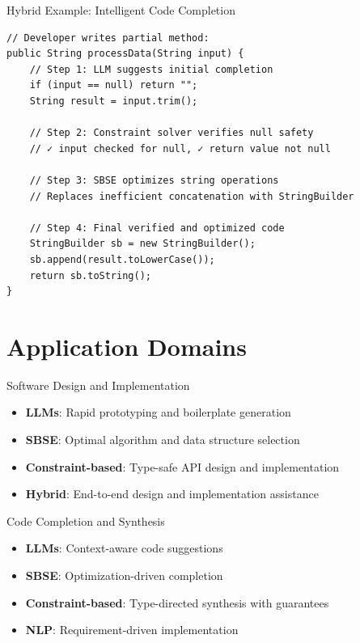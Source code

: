 \documentclass{beamer}
\begin{document}
\begin{frame}[fragile,t]{Hybrid Example: Intelligent Code Completion}
\begin{verbatim}
// Developer writes partial method:
public String processData(String input) {
    // Step 1: LLM suggests initial completion
    if (input == null) return "";
    String result = input.trim();
    
    // Step 2: Constraint solver verifies null safety
    // ✓ input checked for null, ✓ return value not null
    
    // Step 3: SBSE optimizes string operations
    // Replaces inefficient concatenation with StringBuilder
    
    // Step 4: Final verified and optimized code
    StringBuilder sb = new StringBuilder();
    sb.append(result.toLowerCase());
    return sb.toString();
}
\end{verbatim}
\end{frame}

\section{Application Domains}
\begin{frame}[t]{Software Design and Implementation}
\begin{itemize}
\item \textbf{LLMs}: Rapid prototyping and boilerplate generation
\item \textbf{SBSE}: Optimal algorithm and data structure selection
\item \textbf{Constraint-based}: Type-safe API design and implementation
\item \textbf{Hybrid}: End-to-end design and implementation assistance
\end{itemize}
\end{frame}

\begin{frame}[t]{Code Completion and Synthesis}
\begin{itemize}
\item \textbf{LLMs}: Context-aware code suggestions
\item \textbf{SBSE}: Optimization-driven completion
\item \textbf{Constraint-based}: Type-directed synthesis with guarantees
\item \textbf{NLP}: Requirement-driven implementation
\end{itemize}
\end{frame}
\end{document}
